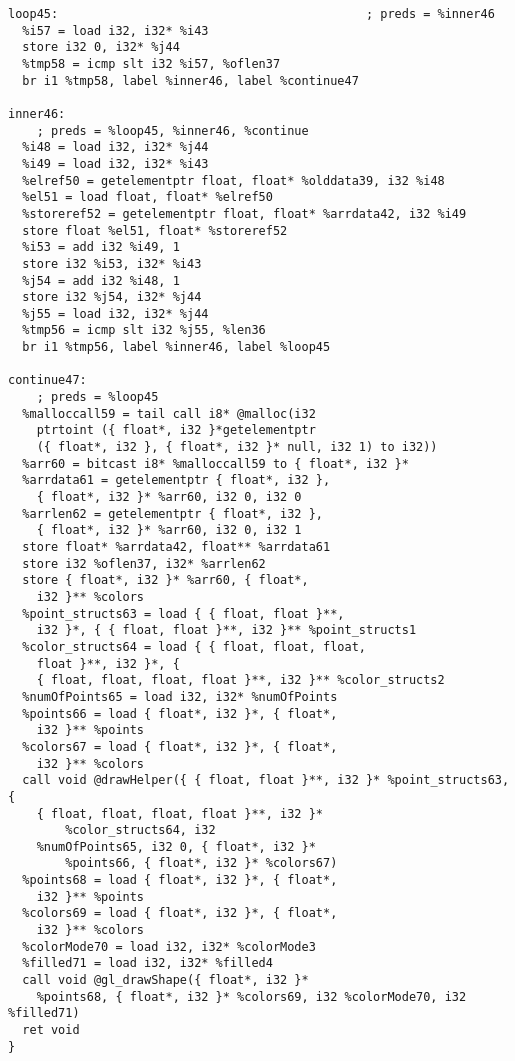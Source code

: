 \documentclass[main.tex]{subfiles}
\begin{document}
{\begin{lstlisting}
loop45:                                           ; preds = %inner46
  %i57 = load i32, i32* %i43
  store i32 0, i32* %j44
  %tmp58 = icmp slt i32 %i57, %oflen37
  br i1 %tmp58, label %inner46, label %continue47

inner46:                                          
    ; preds = %loop45, %inner46, %continue
  %i48 = load i32, i32* %j44
  %i49 = load i32, i32* %i43
  %elref50 = getelementptr float, float* %olddata39, i32 %i48
  %el51 = load float, float* %elref50
  %storeref52 = getelementptr float, float* %arrdata42, i32 %i49
  store float %el51, float* %storeref52
  %i53 = add i32 %i49, 1
  store i32 %i53, i32* %i43
  %j54 = add i32 %i48, 1
  store i32 %j54, i32* %j44
  %j55 = load i32, i32* %j44
  %tmp56 = icmp slt i32 %j55, %len36
  br i1 %tmp56, label %inner46, label %loop45

continue47:                                       
    ; preds = %loop45
  %malloccall59 = tail call i8* @malloc(i32 
    ptrtoint ({ float*, i32 }*getelementptr 
    ({ float*, i32 }, { float*, i32 }* null, i32 1) to i32))
  %arr60 = bitcast i8* %malloccall59 to { float*, i32 }*
  %arrdata61 = getelementptr { float*, i32 },
    { float*, i32 }* %arr60, i32 0, i32 0
  %arrlen62 = getelementptr { float*, i32 },
    { float*, i32 }* %arr60, i32 0, i32 1
  store float* %arrdata42, float** %arrdata61
  store i32 %oflen37, i32* %arrlen62
  store { float*, i32 }* %arr60, { float*, 
    i32 }** %colors
  %point_structs63 = load { { float, float }**,
    i32 }*, { { float, float }**, i32 }** %point_structs1
  %color_structs64 = load { { float, float, float,
    float }**, i32 }*, { 
    { float, float, float, float }**, i32 }** %color_structs2
  %numOfPoints65 = load i32, i32* %numOfPoints
  %points66 = load { float*, i32 }*, { float*,
    i32 }** %points
  %colors67 = load { float*, i32 }*, { float*,
    i32 }** %colors
  call void @drawHelper({ { float, float }**, i32 }* %point_structs63, { 
    { float, float, float, float }**, i32 }*
        %color_structs64, i32 
    %numOfPoints65, i32 0, { float*, i32 }*
        %points66, { float*, i32 }* %colors67)
  %points68 = load { float*, i32 }*, { float*,
    i32 }** %points
  %colors69 = load { float*, i32 }*, { float*,
    i32 }** %colors
  %colorMode70 = load i32, i32* %colorMode3
  %filled71 = load i32, i32* %filled4
  call void @gl_drawShape({ float*, i32 }* 
    %points68, { float*, i32 }* %colors69, i32 %colorMode70, i32 %filled71)
  ret void
}


\end{lstlisting}}
\end{document}
